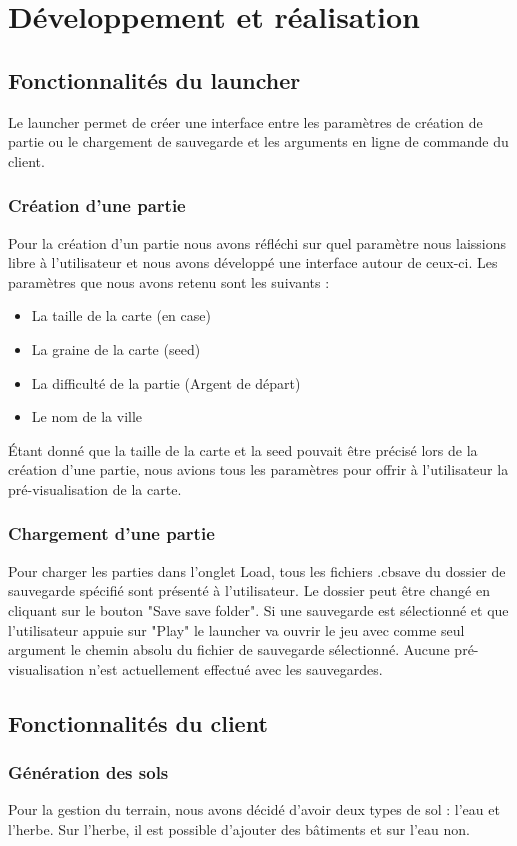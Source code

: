 \documentclass[a4paper,10pt,openany,oneside]{report}
\begin{document}
\chapter{Développement et réalisation}
\thispagestyle{headings}
\section{Fonctionnalités du launcher}
Le launcher permet de créer une interface entre les paramètres de création de partie ou le chargement de sauvegarde et les arguments en ligne de commande du client.
\subsection{Création d'une partie}
Pour la création d'un partie nous avons réfléchi sur quel paramètre nous laissions libre à l'utilisateur et nous avons développé une interface autour de ceux-ci.
\newline
Les paramètres que nous avons retenu sont les suivants :
\begin{itemize}
	\item La taille de la carte (en case)
	\item La graine de la carte (seed)
	\item La difficulté de la partie (Argent de départ)
	\item Le nom de la ville
\end{itemize}
Étant donné que la taille de la carte et la seed pouvait être précisé lors de la création d'une partie, nous avions tous les paramètres pour offrir à l'utilisateur la pré-visualisation de la carte.
\subsection{Chargement d'une partie}
Pour charger les parties dans l'onglet Load, tous les fichiers .cbsave du dossier de sauvegarde spécifié sont présenté à l'utilisateur. Le dossier peut être changé en cliquant sur le bouton "Save save folder".
Si une sauvegarde est sélectionné et que l'utilisateur appuie sur "Play" le launcher va ouvrir le jeu avec comme seul argument le chemin absolu du fichier de sauvegarde sélectionné. Aucune pré-visualisation n'est actuellement effectué avec les sauvegardes.
\section{Fonctionnalités du client}
\subsection{Génération des sols}
Pour la gestion du terrain, nous avons décidé d'avoir deux types de sol : l'eau et l'herbe. Sur l'herbe, il est possible d'ajouter des bâtiments et sur l'eau non.
\end{document}

